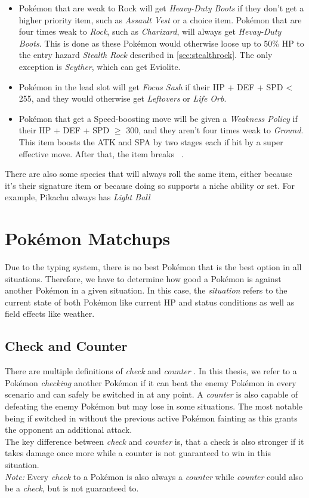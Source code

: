 \begin{itemize}
{	Vest} if their \ac{HP} + \ac{DEF} + \ac{SPD} $\geq$ 235. Otherwise, \textit{Expert Belt},
	\textit{Leftovers} or \textit{Life Orb} is generated.
	\item Pokémon that are weak to Rock will get \textit{Heavy-Duty Boots} if they don't get a 
	higher priority item, such as \textit{Assault Vest} or a choice item. Pokémon that are four
	times weak to \textit{Rock}, such as \textit{Charizard}, will always get \textit{Hevay-Duty Boots}.
	This is done as these Pokémon would otherwise loose up to 50\% \ac{HP} to the entry hazard
	\textit{Stealth Rock} described in \ref{sec:stealthrock}. The only exception is \textit{Scyther},
	which can get Eviolite.
	\item Pokémon in the lead slot will get \textit{Focus Sash} if their \ac{HP} + \ac{DEF} + \ac{SPD} < 255,
	and they would otherwise get \textit{Leftovers} or \textit{Life Orb}.
	\item Pokémon that get a Speed-boosting move will be given a \textit{Weakness Policy} if their \ac{HP}
	+ \ac{DEF} + \ac{SPD} $\geq$ 300, and they aren't four times weak to \textit{Ground}. This item
	boosts the \ac{ATK} and \ac{SPA} by two stages each if hit by a super effective move. After that,
	the item breaks ~\autocite{Bulbapedia:WeaknessPolicy}.
\end{itemize}
There are also some species that will always roll the same item, either because it's their signature item or
because doing so supports a niche ability or set. For example, Pikachu always has \textit{Light Ball}

\section{Pokémon Matchups}
Due to the typing system, there is no best Pokémon that is the best option in all situations. Therefore, we 
have to determine how good a Pokémon is against another Pokémon in a given situation. In this case, the
\textit{situation} refers to the current state of both Pokémon like current \ac{HP} and status conditions
as well as field effects like weather. 
\subsection{Check and Counter}
There are multiple definitions of \textit{check} and \textit{counter} . In
this thesis, we refer to a Pokémon \textit{checking} another Pokémon if it can beat the enemy Pokémon in 
every scenario and can safely be switched in at any point. A \textit{counter} is also capable of defeating
the enemy Pokémon but may lose in some situations. The most notable being if switched in without the
previous active Pokémon fainting as this grants the opponent an additional attack. \\
The key difference between \textit{check} and \textit{counter} is, that a check is also stronger if
it takes damage once more while a counter is not guaranteed to win in this situation. \\
\textit{Note:} Every \textit{check} to a Pokémon is also always a \textit{counter} while \textit{counter}
could also be a \textit{check}, but is not guaranteed to. 